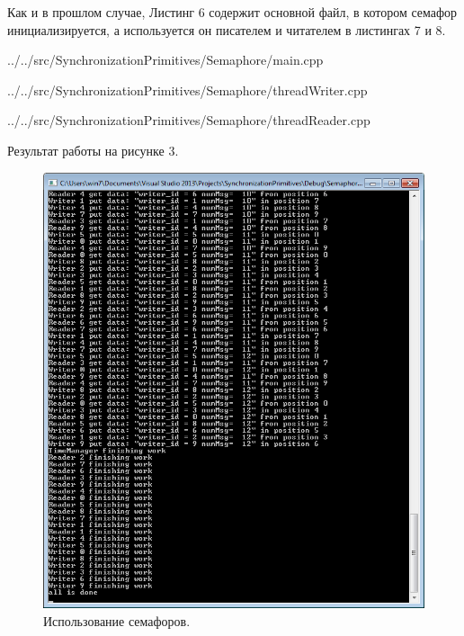 \documentclass[a4paper, 12pt]{article}		%
\begin{document}
Как и в прошлом случае, Листинг 6 содержит основной файл, в котором семафор инициализируется, а используется он писателем и читателем в листингах 7 и 8.


{../../src/SynchronizationPrimitives/Semaphore/main.cpp}
\newpage


{../../src/SynchronizationPrimitives/Semaphore/threadWriter.cpp}


{../../src/SynchronizationPrimitives/Semaphore/threadReader.cpp}

Результат работы на рисунке 3.

\begin{figure}[h!]
\centering
\includegraphics[scale=0.99]{res/002}
\caption{Использование семафоров.}
\end{figure}
\end{document}
